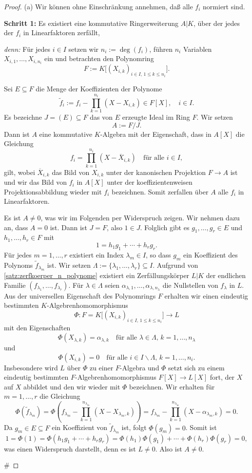 \documentclass[a4paper, twoside, 11pt, ngerman]{report}
\renewcommand{\setminus}{\smallsetminus}
\theoremstyle{definistyle}
\theoremstyle{remark}
\newenvironment{denn}%
  {\par\textit{denn:}}%
  {\hfill\#\par}
\begin{document}
\begin{proof}
(a) Wir können ohne Einschränkung annehmen, daß alle $f_i$ normiert sind.

\textbf{Schritt 1:} Es existiert eine kommutative Ringerweiterung $A|K$, über der jedes der $f_i$ in Linearfaktoren zerfällt,
\begin{denn}
Für jedes $i\in I$ setzen wir $n_i := \deg(f_i)$, führen $n_i$ Variablen $X_{i,1}, \ldots, X_{i,n_i}$ ein und betrachten den Polynomring
\[
F := K\bigl[(X_{i,k})_{i \in I,\,1 \leq k \leq n_i}\bigr].
\]

Sei $E \subseteq F$ die Menge der Koeffizienten der Polynome
\[
\tilde f_i := f_i - \prod_{k=1}^{n_i}(X - X_{i,k}) \in F[X], \quad i \in I.
\]
Es bezeichne $J=(E) \subseteq F$ das von $E$ erzeugte Ideal im Ring $F$. Wir setzen
\[
A := F/J.
\]
Dann ist $A$ eine kommutative $K$-Algebra mit der Eigenschaft, dass in $A[X]$ die Gleichung
\[
f_i = \prod_{k=1}^{n_i}(X - \overline{X}_{i,k}) \quad \text{für alle } i \in I,
\]
gilt, wobei $\overline{X}_{i,k}$ das Bild von $X_{i,k}$ unter der kanonischen Projektion $F \to A$ ist und wir das Bild von $f_i$ in $A[X]$ unter der koeffizientenweisen Projektionsabbildung wieder mit $f_i$ bezeichnen. Somit zerfallen über $A$ alle $f_i$ in Linearfaktoren.

Es ist $A \neq 0$, was wir im Folgenden per Widerspruch zeigen. Wir nehmen dazu an, dass $A=0$ ist. Dann ist $J=F$, also $1 \in J$. Folglich gibt es $g_1,\ldots,g_r \in E$ und $h_1,\ldots,h_r \in F$ mit
\[
1 = h_1g_1 + \cdots + h_rg_r.
\]
Für jedes $m=1,\ldots,r$ existiert ein Index $\lambda_m\in I$, so dass $g_m$ ein Koeffizient des Polynoms $\tilde f_{\lambda_m}$ ist. Wir setzen $\Lambda:=\{\lambda_1,\ldots,\lambda_r\}\subseteq I$. Aufgrund von \ref{satz:zerfkoerper_n_polynome} existiert ein Zerfällungskörper $L|K$ der endlichen Familie $(f_{\lambda_1},\ldots,f_{\lambda_r})$. Für $\lambda\in\Lambda$ seien $\alpha_{\lambda,1},\ldots,\alpha_{\lambda,n_\lambda}$ die Nullstellen von $f_\lambda$ in $L$. Aus der universellen Eigenschaft des Polynomrings $F$ erhalten wir einen eindeutig bestimmten $K$-Algebrenhomomorphismus
\[
\Phi \colon F= K\bigl[(X_{i,k})_{i \in I,\,1 \leq k \leq n_i}\bigr] \to L
\]
mit den Eigenschaften
\[
\Phi(X_{\lambda,k}) = \alpha_{\lambda,k} \quad \text{für alle } \lambda \in \Lambda,\, k=1,\ldots,n_\lambda
\]
und
\[
\Phi(X_{i,k}) = 0 \quad \text{für alle } i \in I \setminus \Lambda,\, k=1,\ldots,n_i.
\]
Insbesondere wird $L$ über $\Phi$ zu einer $F$-Algebra und $\Phi$ setzt sich zu einem eindeutig bestimmten $F$-Algebrenhomomorphismus $F[X]\to L[X]$ fort, der $X$ auf $X$ abbildet und den wir wieder mit $\Phi$ bezeichnen.
Wir erhalten für $m=1,\ldots,r$ die Gleichung
\[
\Phi(\tilde f_{\lambda_m})=\Phi(f_{\lambda_m}-\prod_{k=1}^{n_{\lambda_m}} (X - X_{\lambda_m,k}))= f_{\lambda_m}-\prod_{k=1}^{n_{\lambda_m}}(X-\alpha_{\lambda_m,k})=0.
\]
Da $g_m\in E\subseteq F$ ein Koeffizient von $\tilde{f}_{\lambda_m}$ ist, folgt $\Phi(g_m)=0$. Somit ist
\[
1 = \Phi(1) = \Phi(h_1g_1 + \cdots + h_rg_r) = \Phi(h_1)\Phi(g_1) + \cdots + \Phi(h_r)\Phi(g_r) = 0,
\]
was einen Widerspruch darstellt, denn es ist $L \neq 0$. Also ist $A \neq 0$.


\end{denn}
\end{proof}
\end{document}
